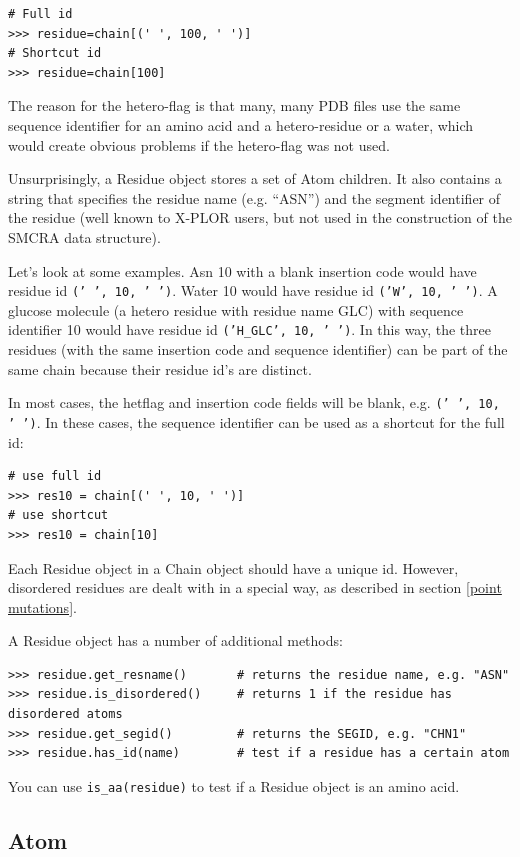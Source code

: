 \documentclass{report}
\begin{document}
\begin{verbatim}
# Full id
>>> residue=chain[(' ', 100, ' ')]
# Shortcut id
>>> residue=chain[100]
\end{verbatim}
The reason for the hetero-flag is that many, many PDB files use the
same sequence identifier for an amino acid and a hetero-residue or
a water, which would create obvious problems if the hetero-flag was
not used. 

Unsurprisingly, a Residue object stores a set of Atom children. It also contains a string that specifies the residue name (e.g. ``ASN'')
and the segment identifier of the residue (well known to X-PLOR users, but not
used in the construction of the SMCRA data structure).

Let's look at some examples. Asn 10 with a blank insertion code would have residue
id {\tt (' ', 10, ' ')}. Water 10 would have residue id {\tt ('W', 10, ' ')}.
A glucose molecule (a hetero residue with residue name GLC) with sequence identifier
10 would have residue id {\tt ('H\_GLC', 10, ' ')}. In this way, the three
residues (with the same insertion code and sequence identifier) can be part
of the same chain because their residue id's are distinct.

In most cases, the hetflag and insertion code fields will be blank, e.g. {\tt (' ', 10, ' ')}.
In these cases, the sequence identifier can be used as a shortcut for the full
id:

\begin{verbatim}
# use full id
>>> res10 = chain[(' ', 10, ' ')]
# use shortcut
>>> res10 = chain[10]
\end{verbatim}

Each Residue object in a Chain object should have a unique id. However, disordered
residues are dealt with in a special way, as described in section \ref{point mutations}.

A Residue object has a number of additional methods:

\begin{verbatim}
>>> residue.get_resname()       # returns the residue name, e.g. "ASN"
>>> residue.is_disordered()     # returns 1 if the residue has disordered atoms
>>> residue.get_segid()	        # returns the SEGID, e.g. "CHN1"
>>> residue.has_id(name)        # test if a residue has a certain atom
\end{verbatim}

You can use \texttt{is\_aa(residue)} to test if a Residue object is an amino acid.

\subsection{Atom}
\end{document}
